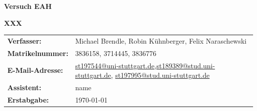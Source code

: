 \documentclass[12pt]{scrartcl} %
\begin{document}
\begin{titlepage}
  \begin{center}
    \vspace*{2cm}
    \begin{LARGE}
      \vspace*{1cm}
      \textbf{\textsf{Versuch EAH \\}}
    \end{LARGE}
    \vspace*{1cm}
    \textbf{\textsf{XXX}}\\
    \vspace*{1.5cm}
    \begin{table}[H]
      \sffamily
      \hspace*{3cm}
      \begin{tabular}{>{\bfseries}p{4cm}p{8cm}}
        Verfasser:      & Michael Brendle, Robin Kühnberger, Felix Naraschewski                                                                                                                                                                         \\
        Matrikelnummer: & 3836158, 3714445, 3836776                                                                                                                                                                                                     \\
        E-Mail-Adresse: & \href{mailto:st197544@uni-stuttgart.de}{st197544@uni-stuttgart.de},\href{mailto:st189389@stud.uni-stuttgart.de}{st189389@stud.uni-stuttgart.de}, \href{mailto:st197995@stud.uni-stuttgart.de}{st197995@stud.uni-stuttgart.de} \\
        Assistent:      & name                                                                                                                                                                                                                          \\
        Erstabgabe:     & \today                                                                                                                                                                                                                        \\
      \end{tabular}
    \end{table}
  \end{center}
\end{titlepage}
\pagestyle{empty}        %
\tableofcontents
\clearpage               %
\pagestyle{scrheadings}  %





\newpage
{}

\printbibliography
\end{document}
